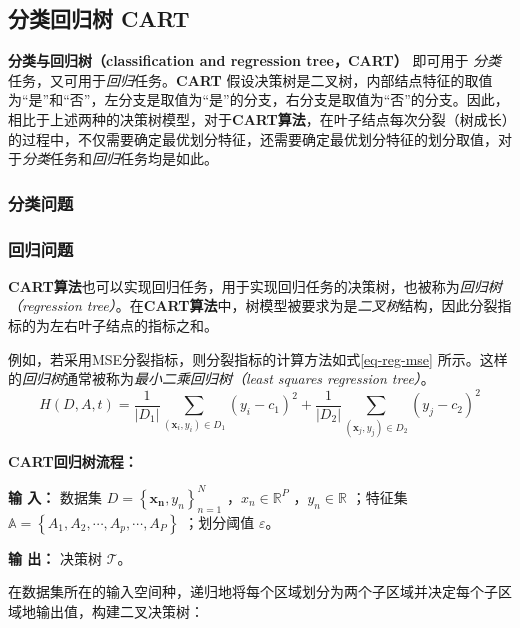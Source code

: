 \documentclass{ctexart}
\numberwithin{equation}{section}
\begin{document}
\subsection{分类回归树 CART}

\textbf{分类与回归树（classification and regression tree，CART）} 即可用于 \emph{分类} 任务，又可用于\emph{回归}任务。\textbf{CART} 假设决策树是二叉树，内部结点特征的取值为“是”和“否”，左分支是取值为“是”的分支，右分支是取值为“否”的分支。因此，相比于上述两种的决策树模型，对于\textbf{CART算法}，在叶子结点每次分裂（树成长）的过程中，不仅需要确定最优划分特征，还需要确定最优划分特征的划分取值，对于\emph{分类}任务和\emph{回归}任务均是如此。

\subsubsection{分类问题}

\subsubsection{回归问题}

\textbf{CART算法}也可以实现回归任务，用于实现回归任务的决策树，也被称为\emph{回归树（regression tree）}。在\textbf{CART算法}中，树模型被要求为是\emph{二叉树}结构，因此分裂指标的为左右叶子结点的指标之和。

例如，若采用MSE分裂指标，则分裂指标的计算方法如式\ref{eq-reg-mse} 所示。这样的\emph{回归树}通常被称为\emph{最小二乘回归树（least squares regression tree）}。
\begin{equation}
	H(D,A,t) = \frac{1}{|D_1|} \sum_{(\boldsymbol{x}_i, y_i) \in D_1} (y_i-c_1)^2 + \frac{1}{|D_2|} \sum_{(\boldsymbol{x}_j, y_j) \in D_2} (y_j-c_2)^2 \label{eq-reg-mse}
\end{equation}

\textbf{CART回归树流程：}

\textbf{输 入：} 数据集 $D = \left\{ \boldsymbol{x_n}, y_n \right\} ^{N}_{n=1}$ ，$x_n \in \mathbb{R}^P$ ，$y_n \in \mathbb{R} $ ；特征集 $\mathbb{A} = \left\{ A_1, A_2, \cdots, A_p, \cdots, A_P \right\}$ ；划分阈值 $\varepsilon$。

\textbf{输 出：} 决策树 $\mathscr{T}$。

在数据集所在的输入空间种，递归地将每个区域划分为两个子区域并决定每个子区域地输出值，构建二叉决策树：
\end{document}
